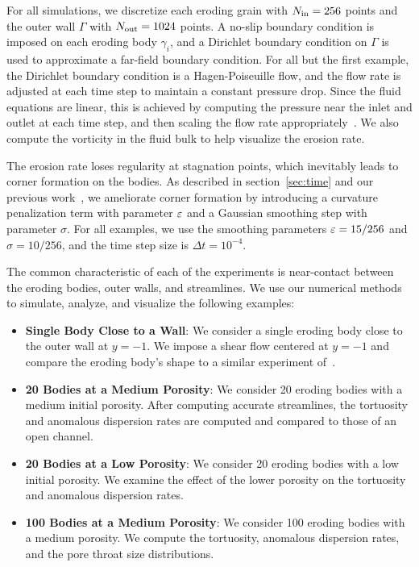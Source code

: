 \documentclass{jfm}
\begin{document}
For all simulations, we discretize each eroding grain with $N_{\mathrm{in}} =
256$ points and the outer wall $\Gamma$ with $N_{\mathrm{out}}=1024$ points.  A
no-slip boundary condition is imposed on each eroding body $\gamma_i$,
and a Dirichlet boundary condition on $\Gamma$ is used to approximate a
far-field boundary condition. For all but the first example, the
Dirichlet boundary condition is a Hagen-Poiseuille flow, and the flow
rate is adjusted at each time step to maintain a constant pressure drop.
Since the fluid equations are linear, this is achieved by computing the
pressure near the inlet and outlet at each time step, and then scaling
the flow rate appropriately~\citep{qua-moo2018}. We also compute the
vorticity in the fluid bulk to help visualize the erosion rate.

The erosion rate loses regularity at stagnation points, which inevitably
leads to corner formation on the bodies.  As described in
section~\ref{sec:time} and our previous work~\citep{qua-moo2018}, we
ameliorate corner formation by introducing a curvature penalization term
with parameter $\varepsilon$ and a Gaussian smoothing step with parameter
$\sigma$.  For all examples, we use the smoothing parameters
$\varepsilon=15/256$ and $\sigma=10/256$, and the time step size is $\Delta t =
10^{-4}$.

The common characteristic of each of the experiments is near-contact
between the eroding bodies, outer walls, and streamlines. We use our
numerical methods to simulate, analyze, and visualize the following
examples:
\begin{itemize}
  \item{\bf Single Body Close to a Wall}: We consider a single eroding
  body close to the outer wall at $y=-1$.  We impose a shear flow
  centered at $y=-1$ and compare the eroding body's shape to a similar
  experiment of~\citet{mit-spa2017}.

  \item{\bf 20 Bodies at a Medium Porosity}: We consider 20 eroding
  bodies with a medium initial porosity.  After computing accurate
  streamlines, the tortuosity and anomalous dispersion rates are
  computed and compared to those of an open channel.

  \item{\bf 20 Bodies at a Low Porosity}: We consider 20 eroding bodies
  with a low initial porosity.  We examine the effect of the lower
  porosity on the tortuosity and anomalous dispersion rates.

  \item{\bf 100 Bodies at a Medium Porosity}: We consider 100 eroding
  bodies with a medium porosity.  We compute the tortuosity, anomalous
  dispersion rates, and the pore throat size distributions.
\end{itemize}
\end{document}

